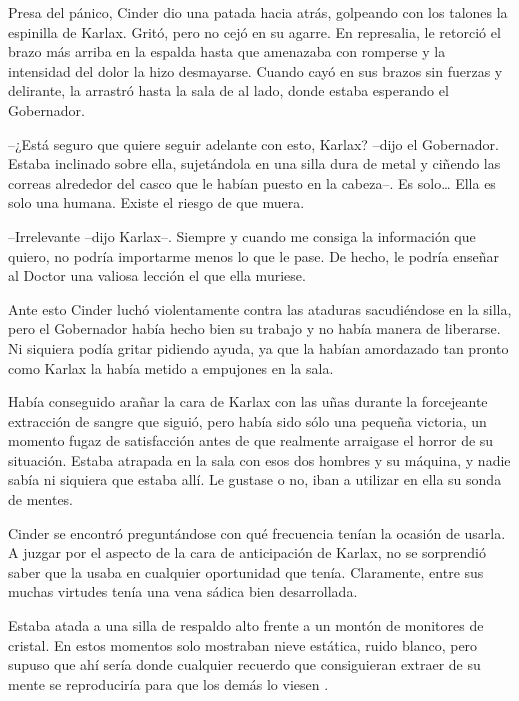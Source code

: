 Presa del pánico, Cinder dio una patada hacia atrás, golpeando con los talones la espinilla de Karlax. Gritó, pero no cejó en su agarre. En represalia, le retorció el brazo más arriba en la espalda hasta que amenazaba con romperse y la intensidad del dolor la hizo desmayarse. Cuando cayó en sus brazos sin fuerzas y delirante, la arrastró hasta la sala de al lado, donde estaba esperando el Gobernador. 



--¿Está seguro que quiere seguir adelante con esto, Karlax? --dijo el Gobernador. Estaba inclinado sobre ella, sujetándola en una silla dura de metal y ciñendo las correas alrededor del casco que le habían puesto en la cabeza--. Es solo… Ella es solo una humana. Existe el riesgo de que muera. 



--Irrelevante --dijo Karlax--. Siempre y cuando me consiga la información que quiero, no podría importarme menos lo que le pase. De hecho, le podría enseñar al Doctor una valiosa lección el que ella muriese. 



Ante esto Cinder luchó violentamente contra las ataduras sacudiéndose en la silla, pero el Gobernador había hecho bien su trabajo y no había manera de liberarse. Ni siquiera podía gritar pidiendo ayuda, ya que la habían amordazado tan pronto como Karlax la había metido a empujones en la sala. 

Había conseguido arañar la cara de Karlax con las uñas durante la forcejeante extracción de sangre que siguió, pero había sido sólo una pequeña victoria, un momento fugaz de satisfacción antes de que realmente arraigase el horror de su situación. Estaba atrapada en la sala con esos dos hombres y su máquina, y nadie sabía ni siquiera que estaba allí. Le gustase o no, iban a utilizar en ella su sonda de mentes. 

Cinder se encontró preguntándose con qué frecuencia tenían la ocasión de usarla. A juzgar por el aspecto de la cara de anticipación de Karlax, no se sorprendió saber que la usaba en cualquier oportunidad que tenía. Claramente, entre sus muchas virtudes tenía una vena sádica bien desarrollada. 

Estaba atada a una silla de respaldo alto frente a un montón de monitores de cristal. En estos momentos solo mostraban nieve estática, ruido blanco, pero supuso que ahí sería donde cualquier recuerdo que consiguieran extraer de su mente se reproduciría para que los demás lo viesen . 

